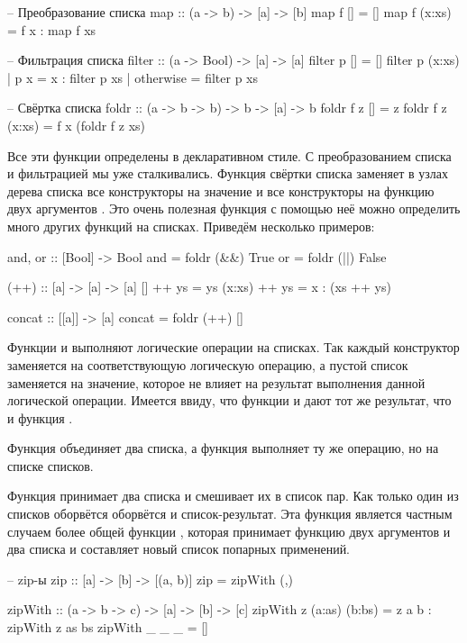 \begin{code}
-- Преобразование списка
map :: (a -> b) -> [a] -> [b]
map f []     = []
map f (x:xs) = f x : map f xs


-- Фильтрация списка
filter :: (a -> Bool) -> [a] -> [a]
filter p []                 = []
filter p (x:xs) | p x       = x : filter p xs
                | otherwise = filter p xs

-- Свёртка списка
foldr            :: (a -> b -> b) -> b -> [a] -> b
foldr f z []     =  z
foldr f z (x:xs) =  f x (foldr f z xs)
\end{code}

Все эти функции определены в декларативном стиле. С преобразованием
списка и фильтрацией мы уже сталкивались. Функция свёртки списка
заменяет в узлах дерева списка все конструкторы \In{[]} на 
значение  и все конструкторы \In{(:)} на функцию двух
аргументов . Это очень полезная функция
с помощью неё можно определить много других функций на списках.
Приведём несколько примеров:

\begin{code}
and, or          :: [Bool] -> Bool
and              =  foldr (&&) True
or               =  foldr (||) False

(++) :: [a] -> [a] -> [a]
[]     ++ ys = ys
(x:xs) ++ ys = x : (xs ++ ys)
    
concat :: [[a]] -> [a]
concat = foldr (++) []
\end{code}

Функции  и  выполняют логические операции 
на списках. Так каждый конструктор \In{(:)} заменяется на 
соответствующую логическую операцию, а пустой список заменяется
на значение, которое не влияет на результат выполнения 
данной логической операции. Имеется ввиду, что функции
 и  дают тот же результат,
что и функция . 

Функция \In{(++)} объединяет два списка, а функция 
выполняет ту же операцию, но на списке списков.

Функция  принимает два списка и смешивает
их в список пар. Как только один из списков оборвётся 
оборвётся и список-результат. Эта функция является
частным случаем более общей функции ,
которая принимает функцию двух аргументов и два списка
и составляет новый список попарных применений.

\begin{code}
-- zip-ы 
zip :: [a] -> [b] -> [(a, b)]
zip = zipWith (,)

zipWith :: (a -> b -> c) -> [a] -> [b] -> [c]
zipWith z (a:as) (b:bs) =  z a b : zipWith z as bs
zipWith _ _ _           =  []
\end{code}

